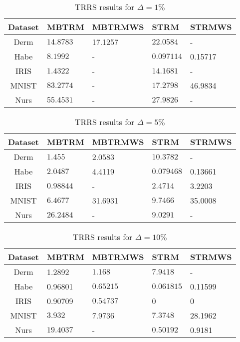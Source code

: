 \documentclass[letterpaper,12pt,titlepage,oneside,final]{book}
\begin{document}
	\begin{table}[h] 
		\centering 
		\begin{tabular}{ |c||l|l||l|l|| } 
			\hline 
			\textbf{Dataset} & \textbf{MBTRM} & \textbf{MBTRMWS} & \textbf{STRM} & \textbf{STRMWS} \\ 
			\hline 
			\hline 
			Derm & $\mathbf{14.8783}$ &17.1257 & $\mathbf{22.0584}$ & -\\ 
			\hline 
			Habe & $\mathbf{8.1992}$ & - & $\mathbf{0.097114}$ &0.15717\\ 
			\hline 
			IRIS & $\mathbf{1.4322}$ & - & $\mathbf{14.1681}$ & -\\ 
			\hline 
			MNIST & $\mathbf{83.2774}$ & - & $\mathbf{17.2798}$ &46.9834\\ 
			\hline 
			Nurs & $\mathbf{55.4531}$ & - & $\mathbf{27.9826}$ & -\\ 
			\hline 
		\end{tabular} 
		\caption{TRRS results for $\Delta = 1\%$} \label{SMBTRMWS1} 
	\end{table}
	\begin{table}[h] 
		\centering 
		\begin{tabular}{ |c||l|l||l|l|| } 
			\hline 
			\textbf{Dataset} & \textbf{MBTRM} & \textbf{MBTRMWS} & \textbf{STRM} & \textbf{STRMWS} \\ 
			\hline 
			\hline 
			Derm & $\mathbf{1.455}$ &2.0583 & $\mathbf{10.3782}$ & -\\ 
			\hline 
			Habe & $\mathbf{2.0487}$ &4.4119 & $\mathbf{0.079468}$ &0.13661\\ 
			\hline 
			IRIS & $\mathbf{0.98844}$ & - & $\mathbf{2.4714}$ &3.2203\\ 
			\hline 
			MNIST & $\mathbf{6.4677}$ &31.6931 & $\mathbf{9.7466}$ &35.0008\\ 
			\hline 
			Nurs & $\mathbf{26.2484}$ & - & $\mathbf{9.0291}$ & -\\ 
			\hline 
		\end{tabular} 
		\caption{TRRS results for $\Delta = 5\%$} \label{SMBTRMWS5} 
	\end{table}
	\begin{table}[h] 
		\centering 
		\begin{tabular}{ |c||l|l||l|l|| } 
			\hline 
			\textbf{Dataset} & \textbf{MBTRM} & \textbf{MBTRMWS} & \textbf{STRM} & \textbf{STRMWS} \\ 
			\hline 
			\hline 
			Derm &1.2892 & $\mathbf{1.168}$ & $\mathbf{7.9418}$ & -\\ 
			\hline 
			Habe &0.96801 & $\mathbf{0.65215}$ & $\mathbf{0.061815}$ &0.11599\\ 
			\hline 
			IRIS &0.90709 & $\mathbf{0.54737}$ & 0 & 0 \\ 
			\hline 
			MNIST & $\mathbf{3.932}$ &7.9736 & $\mathbf{7.3748}$ &28.1962\\ 
			\hline 
			Nurs & $\mathbf{19.4037}$ & - & $\mathbf{0.50192}$ &0.9181\\ 
			\hline 
		\end{tabular} 
		\caption{TRRS results for $\Delta = 10\%$} \label{SMBTRMWS10} \end{table}
	
\end{document}
